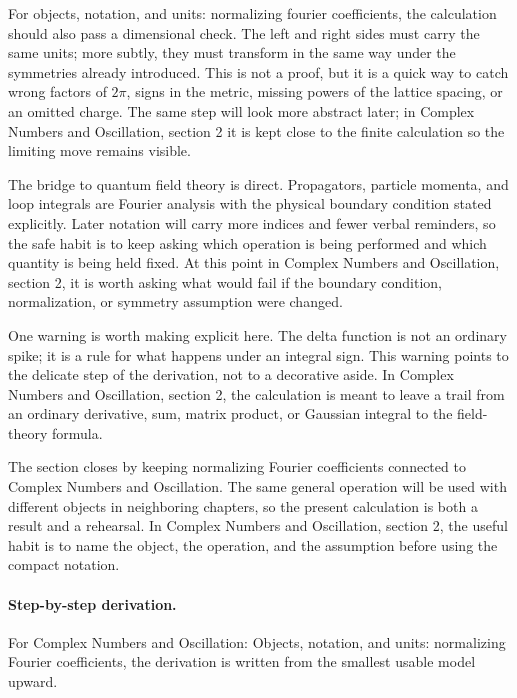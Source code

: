 For objects, notation, and units: normalizing fourier coefficients, the calculation should also pass a dimensional check.  The left and right sides must carry the same units; more subtly, they must transform in the same way under the symmetries already introduced.  This is not a proof, but it is a quick way to catch wrong factors of \(2\pi\), signs in the metric, missing powers of the lattice spacing, or an omitted charge.  The same step will look more abstract later; in Complex Numbers and Oscillation, section 2 it is kept close to the finite calculation so the limiting move remains visible.

The bridge to quantum field theory is direct.  Propagators, particle momenta, and loop integrals are Fourier analysis with the physical boundary condition stated explicitly.  Later notation will carry more indices and fewer verbal reminders, so the safe habit is to keep asking which operation is being performed and which quantity is being held fixed.  At this point in Complex Numbers and Oscillation, section 2, it is worth asking what would fail if the boundary condition, normalization, or symmetry assumption were changed.

One warning is worth making explicit here.  The delta function is not an ordinary spike; it is a rule for what happens under an integral sign.  This warning points to the delicate step of the derivation, not to a decorative aside.  In Complex Numbers and Oscillation, section 2, the calculation is meant to leave a trail from an ordinary derivative, sum, matrix product, or Gaussian integral to the field-theory formula.

The section closes by keeping normalizing Fourier coefficients connected to Complex Numbers and Oscillation.  The same general operation will be used with different objects in neighboring chapters, so the present calculation is both a result and a rehearsal.  In Complex Numbers and Oscillation, section 2, the useful habit is to name the object, the operation, and the assumption before using the compact notation.



\paragraph{Step-by-step derivation.}

For Complex Numbers and Oscillation: Objects, notation, and units: normalizing Fourier coefficients, the derivation is written from the smallest usable model upward.

